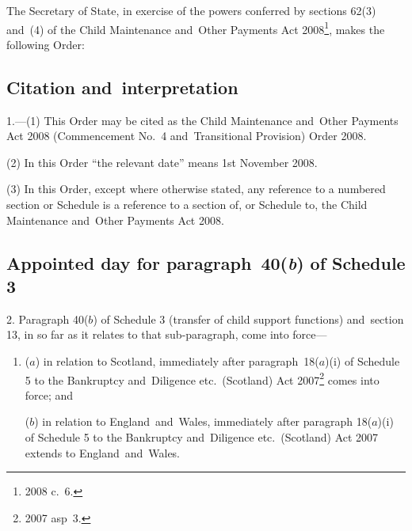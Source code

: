 \documentclass[12pt,a4paper]{article}
\title{\regstitle}
\author{S.I.\ 2008 No.\ 2675 (C.~116)}
\date{Made
7th October 2008
}
\begin{document}
\maketitle

\noindent
The Secretary of State, in exercise of the powers conferred by sections 62(3) and~(4) of the Child Maintenance and~Other Payments Act 2008\footnote{2008 c.~6.}, makes the following Order: 

{\sloppy

\tableofcontents

}

\bigskip

\setcounter{secnumdepth}{-2}

\subsection[1. Citation and~interpretation]{Citation and~interpretation}

1.---(1)  This Order may be cited as the Child Maintenance and~Other Payments Act 2008 (Commencement No.~4 and~Transitional Provision) Order 2008.

(2) In this Order “the relevant date” means 1st November 2008.

(3) In this Order, except where otherwise stated, any reference to a numbered section or Schedule is a reference to a section of, or Schedule to, the Child Maintenance and~Other Payments Act 2008.

\subsection[2. Appointed day for paragraph~40($b$)  of Schedule 3]{Appointed day for paragraph~40(\textbf{\itshape b})  of Schedule 3}

2.  Paragraph 40($b$)  of Schedule 3 (transfer of child support functions) and~section 13, in so far as it relates to that sub-paragraph, come into force—
\begin{enumerate}\item[]
($a$) in relation to Scotland, immediately after paragraph~18($a$)(i)  of Schedule 5 to the Bankruptcy and~Diligence etc.\ (Scotland) Act 2007\footnote{2007 asp~3.} comes into force; and

\begin{sloppypar}
($b$) in relation to England~and~Wales, immediately after paragraph 18($a$)(i)  of Schedule 5 to the Bankruptcy and~Diligence etc.\ (Scotland) Act 2007 extends to England~and~Wales.
\end{sloppypar}
\end{enumerate}
\end{document}

